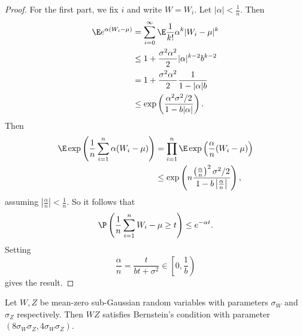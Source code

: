 \documentclass[a4paper]{article}
\begin{document}
\begin{proof}
  For the first part, we fix $i$ and write $W = W_i$. Let $|\alpha| < \frac{1}{n}$. Then
  \begin{align*}
    \E e^{\alpha(W_i - \mu)} &= \sum_{i = 0}^\infty \E \frac{1}{k!} \alpha^k |W_i - \mu|^k\\
    &\leq 1 + \frac{\sigma^2 \alpha^2}{2} |\alpha|^{k - 2} b^{k - 2}\\
    &= 1 + \frac{\sigma^2 \alpha^2}{2} \frac{1}{1 - |\alpha|b}\\
    &\leq \exp \left(\frac{\alpha^2 \sigma^2/2}{1 - b|\alpha|}\right).
  \end{align*}
  Then
  \begin{align*}
    \E \exp\left(\frac{1}{n} \sum_{i = 1}^n \alpha (W_i - \mu)\right) &= \prod_{i = 1}^n \E \exp\left(\frac{\alpha}{n} (W_i - \mu)\right)\\
    &\leq \exp \left(n \frac{\left(\frac{\alpha}{n}\right)^2 \sigma^2/2}{1 - b \left|\frac{\alpha}{n}\right|}\right),
  \end{align*}
  assuming $\left|\frac{\alpha}{n}\right| < \frac{1}{n}$. So it follows that
  \[
    \P \left(\frac{1}{n} \sum_{i = 1}^n W_i - \mu \geq t\right) \leq e^{-\alpha t}.
  \]
  Setting
  \[
    \frac{\alpha}{n} = \frac{t}{bt + \sigma^2} \in \left[0, \frac{1}{b}\right)
  \]
  gives the result.
\end{proof}

\begin{lemma}
  Let $W, Z$ be mean-zero sub-Gaussian random variables with parameters $\sigma_W$ and $\sigma_Z$ respectively. Then $WZ$ satisfies Bernstein's condition with parameter $(8 \sigma_W \sigma_Z, 4 \sigma_W \sigma_Z)$.
\end{lemma}
\end{document}
